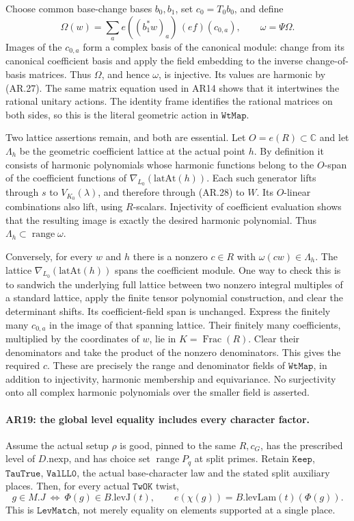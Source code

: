 Choose common base-change bases $b_0,b_1$, set $c_0=T_0b_0$, and define
\[
 \Omega(w)=\sum_a e((b_1^*w)_a)\,
                      (ef)(c_{0,a}),\qquad \omega=\Psi\Omega.    \tag{AR.28}
\]
Images of the $c_{0,a}$ form a complex basis of the canonical module:
change from its canonical coefficient basis and apply the field
embedding to the inverse change-of-basis matrices. Thus $\Omega$,
and hence $\omega$, is injective. Its values are harmonic by (AR.27).
The same matrix equation used in AR14 shows that it intertwines
the rational unitary actions. The identity frame identifies the
rational matrices on both sides, so this is the literal
geometric action in $\texttt{WtMap}$.

Two lattice assertions remain, and both are essential. Let
$O=e(R)\subset\mathbb C$ and let $\Lambda_h$ be the geometric
coefficient lattice at the actual point $h$. By definition it
consists of harmonic polynomials whose harmonic functions belong
to the $O$-span of the coefficient functions of
$\nabla_{\!L_0}(\mathrm{latAt}(h))$. Each such generator lifts through
$s$ to $V_{K_0}(\lambda)$, and therefore through (AR.28) to $W$.
Its $O$-linear combinations also lift, using $R$-scalars.
Injectivity of coefficient evaluation shows that the resulting
image is exactly the desired harmonic polynomial. Thus
$\Lambda_h\subset\operatorname{range}\omega$.

Conversely, for every $w$ and $h$ there is a nonzero $c\in R$ with
$\omega(cw)\in\Lambda_h$. The lattice
$\nabla_{\!L_0}(\mathrm{latAt}(h))$ spans the coefficient module.
One way to check this is to sandwich the underlying full lattice
between two nonzero integral multiples of a standard lattice,
apply the finite tensor polynomial construction, and clear the
determinant shifts. Its coefficient-field span is unchanged.
Express the finitely many $c_{0,a}$ in the image of that spanning
lattice. Their finitely many coefficients, multiplied by the
coordinates of $w$, lie in $K=\operatorname{Frac}(R)$.
Clear their denominators and take the product of the nonzero
denominators. This gives the required $c$.
These are precisely the range and denominator fields of
$\texttt{WtMap}$, in addition to injectivity, harmonic membership
and equivariance. No surjectivity onto all complex harmonic
polynomials over the smaller field is asserted.

\paragraph{AR19: the global level equality includes every character factor.}
Assume the actual setup $\rho$ is good, pinned to the same
$R,c_G$, has the prescribed level of $D.\mathrm{nexp}$, and has
choice set $\operatorname{range}P_q$ at split primes.
Retain $\texttt{Keep}$, $\texttt{TauTrue}$, $\texttt{ValLL0}$,
the actual base-character law and the stated split auxiliary
places. Then, for every actual $\texttt{TwOK}$ twist,
\[
 g\in M.J\ \Longleftrightarrow\ \Phi(g)\in B.\mathrm{levJ}(t),
 \qquad
 e(\chi(g))=B.\mathrm{levLam}(t)(\Phi(g)).                \tag{AR.29}
\]
This is $\texttt{LevMatch}$, not merely equality on elements
supported at a single place.

